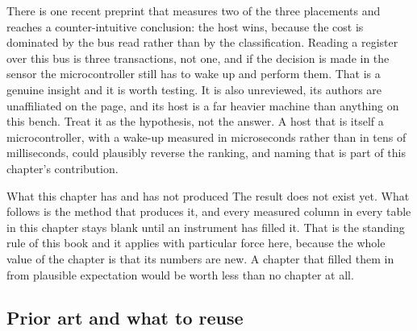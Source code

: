 There is one recent preprint that measures two of the three placements and
reaches a counter-intuitive conclusion: the host wins, because the cost is
dominated by the bus read rather than by the classification. Reading a register
over this bus is three transactions, not one, and if the decision is made in the
sensor the microcontroller still has to wake up and perform them. That is a
genuine insight and it is worth testing. It is also unreviewed, its authors are
unaffiliated on the page, and its host is a far heavier machine than anything on
this bench. Treat it as the hypothesis, not the answer. A host that is itself a
microcontroller, with a wake-up measured in microseconds rather than in tens of
milliseconds, could plausibly reverse the ranking, and naming that is part of
this chapter's contribution.

\begin{note}{What this chapter has and has not produced}
The result does not exist yet. What follows is the method that produces it, and
every measured column in every table in this chapter stays blank until an
instrument has filled it. That is the standing rule of this book and it applies
with particular force here, because the whole value of the chapter is that its
numbers are new. A chapter that filled them in from plausible expectation would
be worth less than no chapter at all.
\end{note}

\subsection*{Prior art and what to reuse}

